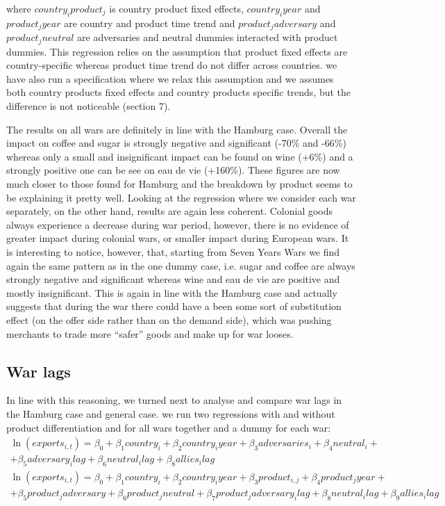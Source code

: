 \documentclass[12pt,a4paper,titlepage,english]{article}
\begin{document}
where $country_iproduct_j$ is country product fixed effects, $country_iyear$ and $product_jyear$ are country and product time trend and $product_jadversary$ and $product_jneutral$ are adversaries and neutral dummies interacted with product dummies. This regression relies on the assumption that product fixed effects are country-specific whereas product time trend do not differ across countries. we have also run a specification where we relax this assumption and we assumes both country products fixed effects and country products specific trends, but the difference is not noticeable (section 7). 

The results on all wars are definitely in line with the Hamburg case. Overall the impact on coffee and sugar is strongly negative and significant (-70\% and -66\%) whereas only a small and insignificant impact can be found on wine (+6\%) and a strongly positive one can be see on eau de vie (+160\%). These figures are now much closer to those found for Hamburg and the breakdown by product seems to be explaining it pretty well. Looking at the regression where we consider each war separately, on the other hand, results are again less coherent. Colonial goods always experience a decrease during war period, however, there is no evidence of greater impact during colonial wars, or smaller impact during European wars. It is interesting to notice, however, that, starting from Seven Years Wars we find again the same pattern as in the one dummy case, i.e. sugar and coffee are always strongly negative and significant whereas wine and eau de vie are positive and mostly insignificant. This is again in line with the Hamburg case and actually suggests that during the war there could have a been some sort of substitution effect (on the offer side rather than on the demand side), which was pushing merchants to trade more “safer” goods and make up for war looses.\\
\iffalse
\subsection{War lags}
In line with this reasoning, we turned next to analyse and compare war lags in the Hamburg case and general case. we run two regressions with and without product differentiation and for all wars together and a dummy for each war: 
\begin{multline}
\ln(exports_{i,t})=\beta_0+\beta_1country_i+\beta_2country_iyear+\beta_3adversaries_i+\beta_4neutral_i+\\+\beta_5adversary_ilag+\beta_6neutral_ilag+\beta_8allies_ilag
\end{multline}
\begin{multline}
\ln(exports_{i,t})=\beta_0+\beta_1country_i+\beta_2country_iyear+\beta_3product_{i,j}+\beta_4product_jyear+\\+\beta_5product_jadversary+ \beta_6product_jneutral+\beta_7product_jadversary_ilag+\beta_8neutral_ilag+\beta_9allies_ilag
\end{multline}
\end{document}
